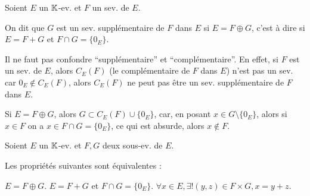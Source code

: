 \documentclass[12pt, a4paper]{report}
\begin{document}
\begin{definition}
    Soient $E$ un $\mathbb{K}$-ev. et $F$ un sev. de $E$.

    On dit que $G$ est un sev. supplémentaire de $F$ dans $E$ si $E = F \oplus G$, c'est à dire si $E = F+G$ et $F \cap G = \{0_E\}$.
\end{definition}

\begin{attention}
    Il ne faut pas confondre ``supplémentaire'' et ``complémentaire''. En effet, si $F$ est un sev. de $E$, alors $C_E(F)$ (le complémentaire de $F$ dans $E$) n'est pas un sev. car $0_E \notin C_E(F)$, alors $C_E(F)$ ne peut pas être un sev. supplémentaire de $F$ dans $E$.
\end{attention}

\begin{remark}
    Si $E = F \oplus G$, alors $G \subset C_E(F)\cup\{0_E\}$, car, en posant $x \in G\setminus\{0_E\}$, alors si $x \in F$ on a $x \in F\cap G = \{0_E\}$, ce qui est absurde, alors $x \notin F$.
\end{remark}

\begin{property}
    Soient $E$ un $\mathbb{K}$-ev. et $F,G$ deux sous-ev. de $E$.

    Les propriétés suivantes sont équivalentes :

    \begin{outline}
        \1 $E = F \oplus G$.
        \1 $E = F + G$ et $F \cap G = \{0_E\}$.
        \1 $\forall x \in E, \exists ! (y,z) \in F\times G, x = y+z$.
    \end{outline}
\end{property}
\end{document}

